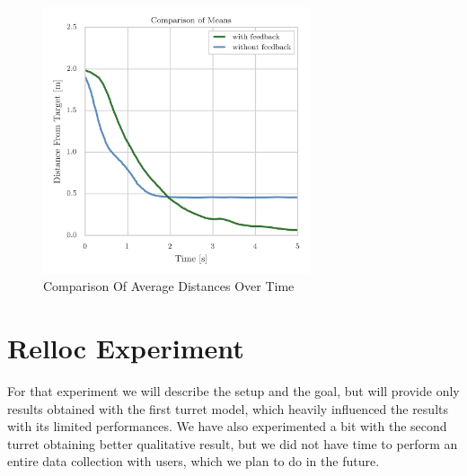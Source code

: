 \begin{figure}
	\centering
	\includegraphics[width=0.7\textwidth]{img/avgDistance.png}%
	\caption{Comparison Of Average Distances Over Time}
	\label{fig:avgDistance}
\end{figure}

\section{Relloc Experiment}
For that experiment we will describe the setup and the goal, but will provide only results obtained with the first turret model, which heavily influenced the results with its limited performances. We have also experimented a bit with the second turret obtaining better qualitative result, but we did not have time to perform an entire data collection with users, which we plan to do in the future.

